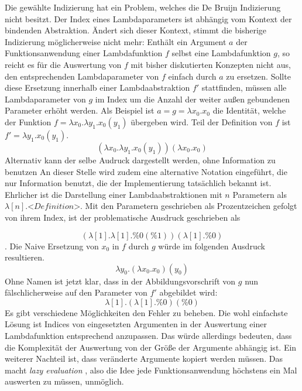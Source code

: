  Die gewählte Indizierung hat ein Problem, welches die De Bruijn Indizierung nicht besitzt. Der Index eines Lambdaparameters ist abhängig vom Kontext der bindenden Abstraktion. Ändert sich dieser Kontext, stimmt die bisherige Indizierung möglicherweise nicht mehr:
 Enthält ein Argument $a$ der Funktionsanwendung einer Lambdafunktion $f$ selbst eine Lambdafunktion $g$, so reicht es für die Auswertung von $f$ mit bisher diskutierten Konzepten nicht aus, den entsprechenden Lambdaparameter von $f$ einfach durch $a$ zu ersetzen. Sollte diese Ersetzung innerhalb einer Lambdaabstraktion $f'$ stattfinden, müssen alle Lambdaparameter von $g$ im Index um die Anzahl der weiter außen gebundenen Parameter erhöht werden. Als Beispiel ist $a = g = \lambda x_0 .x_0$ die Identität, welche der Funktion $f = \lambda x_0 .\lambda y_1 .x_0(y_1)$ übergeben wird. Teil der Definition von $f$ ist $f' = \lambda y_1 .x_0(y_1)$.
 $$(\lambda x_0 .\lambda y_1 .x_0(y_1))(\lambda x_0 .x_0)$$
 Alternativ kann der selbe Audruck dargestellt werden, ohne Information zu benutzen
 An dieser Stelle wird zudem eine alternative Notation eingeführt, die nur Information benutzt, die der Implementierung tatsächlich bekannt ist. Ehrlicher ist die Darstellung einer Lambdaabstraktionen mit $n$ Parametern als $\lambda [n] .\textit{<Definition>}$. Mit den Parametern geschrieben als Prozentzeichen gefolgt von ihrem Index, ist der problematische Ausdruck geschrieben als
 
 $$(\lambda [1] .\lambda [1] .\%0(\%1))(\lambda [1] .\%0)$$.
 Die Naive Ersetzung von $x_0$ in $f$ durch $g$ würde im folgenden Ausdruck resultieren.
 $$\lambda y_0 .(\lambda x_0 .x_0)(y_0)$$
 Ohne Namen ist jetzt klar, dass in der Abbildungsvorschrift von $g$ nun fälschlicherweise auf den Parameter von $f'$ abgebildet wird:
 $$\lambda [1] .(\lambda [1] .\%0)(\%0)$$
 Es gibt verschiedene Möglichkeiten den Fehler zu beheben. Die wohl einfachste Lösung ist Indices von eingesetzten Argumenten in der Auswertung einer Lambdafunktion entsprechend anzupassen. Das würde allerdings bedeuten, dass die Komplexität der Auswertung von der Größe der Argumente abhängig ist. Ein weiterer Nachteil ist, dass veränderte Argumente kopiert werden müssen. Das macht \textit{lazy evaluation} \cite{EvalStrategien}, also die Idee jede Funktionsanwendung höchstens ein Mal auswerten zu müssen, unmöglich.
 
